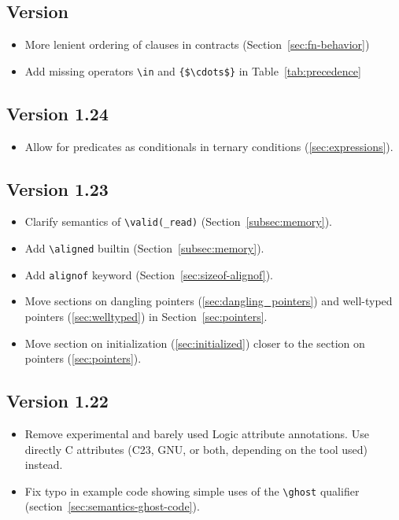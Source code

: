 \subsection{Version \version}
\begin{itemize}
  \item More lenient ordering of clauses in contracts (Section~\ref{sec:fn-behavior})
  \item Add missing operators \lstinline{\in} and \lstinline|{$\cdots$}| in Table~\ref{tab:precedence}
\end{itemize}


\subsection{Version 1.24}
\begin{itemize}
  \item Allow for predicates as conditionals in ternary conditions (\ref{sec:expressions}).
\end{itemize}

\subsection{Version 1.23}
\begin{itemize}
  \item Clarify semantics of \lstinline|\valid(_read)| (Section~\ref{subsec:memory}).
  \item Add \lstinline|\aligned| builtin (Section~\ref{subsec:memory}).
  \item Add \lstinline|alignof| keyword (Section~\ref{sec:sizeof-alignof}).
  \item Move sections on dangling pointers (\ref{sec:dangling_pointers}) and
        well-typed pointers (\ref{sec:welltyped}) in Section~\ref{sec:pointers}.
  \item Move section on initialization (\ref{sec:initialized}) closer to the
        section on pointers (\ref{sec:pointers}).
\end{itemize}

\subsection{Version 1.22}
\begin{itemize}
\item Remove experimental and barely used Logic attribute annotations.
Use directly C attributes (C23, GNU, or both, depending on the tool used) instead.
\item Fix typo in example code showing simple uses of the \lstinline|\ghost| qualifier (section~\ref{sec:semantics-ghost-code}).
\end{itemize}
